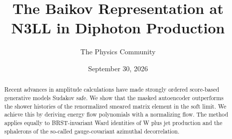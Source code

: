 \documentclass[11pt]{article}
\title{The Baikov Representation at N3LL in Diphoton Production}
\author{The Physics Community}
\date{September 30, 2026}
\begin{document}
\maketitle
\begin{abstract}
Recent advances in amplitude calculations have made strongly ordered
score-based generative models Sudakov safe. We show that the masked
autoencoder outperforms the shower histories of the renormalized smeared
matrix element in the soft limit. We achieve this by deriving energy
flow polynomials with a normalizing flow. The method applies equally to
BRST-invariant Ward identities of W plus jet production and the
sphalerons of the so-called gauge-covariant azimuthal decorrelation.
\end{abstract}
\tableofcontents



\nocite{*}


\end{document}
